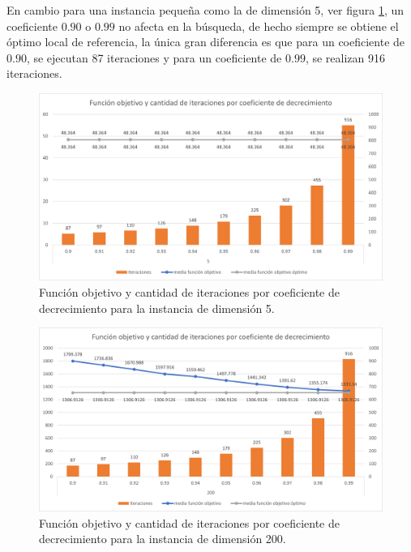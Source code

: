 En cambio para una instancia pequeña como la de dimensión 5, ver figura \ref{graph:f_i_por_k_instance_5}, un coeficiente $0.90$ o $0.99$ no afecta en la búsqueda, de hecho siempre se obtiene el óptimo local de referencia, la única gran diferencia es que para un coeficiente de $0.90$, se ejecutan 87 iteraciones y para un coeficiente de $0.99$, se realizan 916 iteraciones.

\begin{figure}[!ht]
    \centering
    \includegraphics[width=\textwidth]{images/testing/funcion_objetivo_vs_k_5.png}
    \caption{Función objetivo y cantidad de iteraciones por coeficiente de decrecimiento para la instancia de dimensión 5.}
    \label{graph:f_i_por_k_instance_5}
\end{figure}

\begin{figure}[!ht]
    \centering
    \includegraphics[width=\textwidth]{images/testing/funcion_objetivo_vs_k_200.png}
    \caption{Función objetivo y cantidad de iteraciones por coeficiente de decrecimiento para la instancia de dimensión 200.}
    \label{graph:f_i_por_k_instance_200}
\end{figure}

